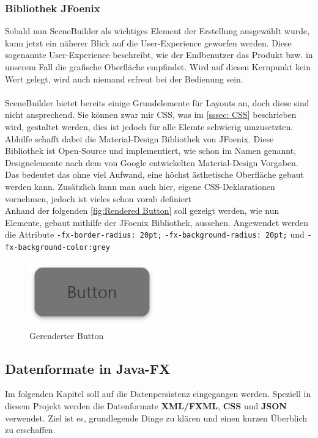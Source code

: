 \subsubsection{Bibliothek JFoenix}
Sobald nun SceneBuilder als wichtiges Element der Erstellung ausgewählt wurde, kann jetzt ein näherer Blick auf die User-Experience geworfen werden.
Diese sogenannte User-Experience beschreibt, wie der Endbenutzer das Produkt bzw. in unserem Fall die grafische Oberfläche empfindet.
Wird auf diesen Kernpunkt kein Wert gelegt, wird auch niemand erfreut bei der Bedienung sein.\\\\
SceneBuilder bietet bereits einige Grundelemente für Layouts an, doch diese sind nicht ansprechend.
Sie können zwar mir CSS, was im \autoref{sssec: CSS} beschrieben wird, gestaltet werden, dies ist jedoch für alle Elemte schwierig umzusetzten.
Abhilfe schafft dabei die Material-Design Bibliothek von JFoenix.
Diese Bibliothek ist Open-Source und implementiert, wie schon im Namen genannt, Designelemente nach dem von Google entwickelten Material-Design Vorgaben.
Das bedeutet das ohne viel Aufwand, eine höchst ästhetische Oberfläche gebaut werden kann.
Zusätzlich kann man auch hier, eigene CSS-Deklarationen vornehmen, jedoch ist vieles schon vorab definiert\\
Anhand der folgenden \autoref{fig:Rendered Button} soll gezeigt werden, wie nun Elemente, gebaut mithilfe der JFoenix Bibliothek, aussehen.
Angewendet werden die Attribute \lstinline{-fx-border-radius: 20pt;}  \lstinline{-fx-background-radius: 20pt;} und \lstinline{-fx-background-color:grey}
\begin{figure}[H]
    \centering
    \includegraphics[width=0.5\textwidth]{fig/ainf/RenderedButton.PNG}
    \caption{Gerenderter Button}
    \label{fig:Rendered Button}
\end{figure}
\subsection{Datenformate in Java-FX}\label{subsec:datenformate-in-java-fx}
Im folgenden Kapitel soll auf die Datenpersistenz eingegangen werden.
Speziell in diesem Projekt werden die Datenformate \textbf{XML/FXML}, \textbf{CSS} und \textbf{JSON} verwendet.
Ziel ist es, grundlegende Dinge zu klären und einen kurzen Überblich zu erschaffen.
